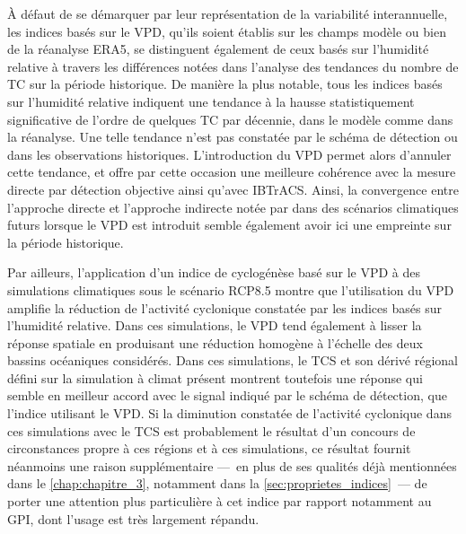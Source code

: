 \documentclass[../main.tex]{subfiles}
\begin{document}
À défaut de se démarquer par leur représentation de la variabilité interannuelle, les indices basés sur le VPD, qu'ils soient établis sur les champs modèle ou
bien de la réanalyse ERA5, se distinguent également de ceux basés sur l'humidité relative à travers les différences notées dans l'analyse des tendances du
nombre de TC sur la période historique. De manière la plus notable, tous les indices basés sur l'humidité relative indiquent une tendance à la hausse
statistiquement significative de l'ordre de quelques TC par décennie, dans le modèle comme dans la réanalyse. Une telle tendance n'est pas constatée par le
schéma de détection ou dans les observations historiques. L'introduction du VPD permet alors d'annuler cette tendance, et offre par cette occasion une meilleure
cohérence avec la mesure directe par détection objective ainsi qu'avec IBTrACS. Ainsi, la convergence entre l'approche directe et l'approche indirecte notée par
\textcite{camargo_testing_2014} dans des scénarios climatiques futurs lorsque le VPD est introduit semble également avoir ici une empreinte sur la période
historique.

Par ailleurs, l'application d'un indice de cyclogénèse basé sur le VPD à des simulations climatiques sous le scénario RCP8.5 montre que l'utilisation du VPD
amplifie la réduction de l'activité cyclonique constatée par les indices basés sur l'humidité relative. Dans ces simulations, le VPD tend également à lisser la
réponse spatiale en produisant une réduction homogène à l'échelle des deux bassins océaniques considérés. Dans ces simulations, le TCS et son dérivé régional
défini sur la simulation à climat présent montrent toutefois une réponse qui semble en meilleur accord avec le signal indiqué par le schéma de détection, que
l'indice utilisant le VPD. Si la diminution constatée de l'activité cyclonique dans ces simulations avec le TCS est probablement le résultat d'un concours de
circonstances propre à ces régions et à ces simulations, ce résultat fournit néanmoins une raison supplémentaire ---~en plus de ses qualités déjà mentionnées
dans le \cref{chap:chapitre_3}, notamment dans la \cref{sec:proprietes_indices}~--- de porter une attention plus particulière à cet indice par rapport notamment
au GPI, dont l'usage est très largement répandu.
\end{document}
